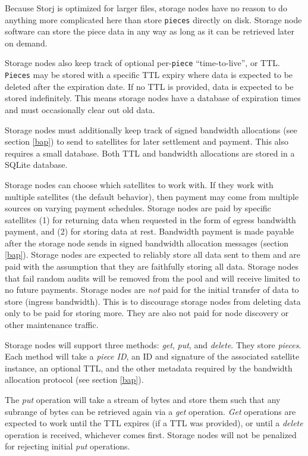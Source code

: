 \documentclass[11pt,fleqn,openany]{book}
\newcommand{\x}[1]{{\tt #1}} \newcommand{\code}[1]{{\em #1}}
\begin{document}
Because Storj is optimized for larger files, storage nodes have no reason to do
anything more complicated here than store \x{pieces} directly on disk. Storage
node software can store the piece data in any way as long as it can be
retrieved later on demand.

Storage nodes also keep track of optional per-\x{piece} ``time-to-live'', or TTL.
\x{Pieces} may be stored with a specific TTL expiry where data is expected to
be deleted after the expiration date. If no TTL is provided, data is expected
to be stored indefinitely. This means storage nodes have a database of
expiration
times and must occasionally clear out old data.

Storage nodes must additionally keep track of signed bandwidth allocations
(see section \ref{bap}) to send to
satellites for later settlement and payment. This also requires a small
database. Both TTL and bandwidth allocations are stored in a SQLite
\cite{sqlite} database.

Storage nodes can choose which satellites to work with. If they work
with multiple satellites (the default behavior), then payment may come from
multiple sources on varying payment schedules.
Storage nodes are paid by specific satellites (1) for returning data when
requested in
the form of egress bandwidth payment, and (2) for storing data at rest.
Bandwidth payment is made payable after
the storage node sends in signed bandwidth allocation messages
(section \ref{bap}).
Storage nodes are expected to reliably store all data sent to them and are
paid
with the assumption that they are faithfully storing all data.
Storage nodes that fail random audits will be removed from the pool and will
receive
limited to no future payments.
Storage nodes are {\em not} paid for the initial transfer of data to store
(ingress
bandwidth). This is to discourage storage nodes from deleting data only to be
paid for
storing more. They are also not paid for node discovery or other
maintenance traffic.

Storage nodes will support three methods: \code{get}, \code{put}, and
\code{delete}. They store {\em pieces}.
Each method will take a {\em piece ID}, an ID and signature of the associated
satellite instance, an optional TTL, and the other metadata required by the
bandwidth allocation protocol (see section \ref{bap}).

The \code{put} operation will take a stream of bytes and store them such
that any subrange of bytes can be retrieved again via a \code{get} operation.
\code{Get} operations are expected to work until the TTL expires (if a TTL was
provided), or until a \code{delete} operation is received, whichever comes
first.
Storage
nodes will not be penalized for rejecting initial \code{put} operations.
\end{document}
